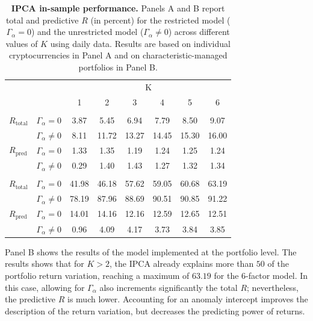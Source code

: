 \documentclass[
  12pt,
  a4paper,
  openany]{scrbook}
\begin{document}
\begin{table}[h]
\centering
\small
\caption[IPCA in-sample performance.]%
{%
\textbf{IPCA in-sample performance.}
Panels A and B report total and predictive $R$ (in percent) for the restricted model ($\Gamma_\alpha = 0$) and the unrestricted model ($\Gamma_\alpha \neq 0$) across different values of $K$ using daily data. Results are based on individual cryptocurrencies in Panel A and on characteristic-managed portfolios in Panel B. 
}
\label{tbl-ipca_results}
\vspace{5pt} %
\begin{tabular}{lccccccc}
\toprule
 &  & \multicolumn{6}{c}{K} \\
\cmidrule(lr){3-8}
 &  & 1 & 2 & 3 & 4 & 5 & 6 \\
\midrule\addlinespace[2.5pt]
\multicolumn{8}{l}{Panel A: Individual cryptocurrencies ($r_t$)} \\[2.5pt]
\midrule\addlinespace[2.5pt]
$R_{\text{total}}$      & $\Gamma_{\alpha} = 0$     & 3.87 & 5.45 & 6.94 & 7.79 & 8.50 & 9.07 \\
                            & $\Gamma_{\alpha} \neq 0$  & 8.11 & 11.72 & 13.27 & 14.45 & 15.30 & 16.00 \\
$R_{\text{pred}}$ & $\Gamma_{\alpha} = 0$     & 1.33 & 1.35 & 1.19 & 1.24 & 1.25 & 1.24 \\
                            & $\Gamma_{\alpha} \neq 0$  & 0.29 & 1.40 & 1.43 & 1.27 & 1.32 & 1.34 \\
\midrule\addlinespace[2.5pt]
\multicolumn{8}{l}{Panel B: Managed portfolios ($x_t$)} \\[2.5pt]
\midrule\addlinespace[2.5pt]
$R_{\text{total}}$      & $\Gamma_{\alpha} = 0$     & 41.98 & 46.18 & 57.62 & 59.05 & 60.68 & 63.19 \\
                            & $\Gamma_{\alpha} \neq 0$  & 78.19 & 87.96 & 88.69 & 90.51 & 90.85 & 91.22 \\
$R_{\text{pred}}$ & $\Gamma_{\alpha} = 0$     & 14.01 & 14.16 & 12.16 & 12.59 & 12.65 & 12.51 \\
                            & $\Gamma_{\alpha} \neq 0$  & 0.96 & 4.09 & 4.17 & 3.73 & 3.84 & 3.85 \\
\bottomrule
\end{tabular}
\end{table}

Panel B shows the results of the model implemented at the portfolio
level. The results shows that for \(K>2\), the IPCA already explains
more than \(50%
\) of the portfolio return variation, reaching a maximum of \(63.19%
\) for the 6-factor model. In this case, allowing for \(\Gamma_\alpha\)
also increments significantly the total \(R\); nevertheless, the
predictive \(R\) is much lower. Accounting for an anomaly intercept
improves the description of the return variation, but decreases the
predicting power of returns.
\end{document}
